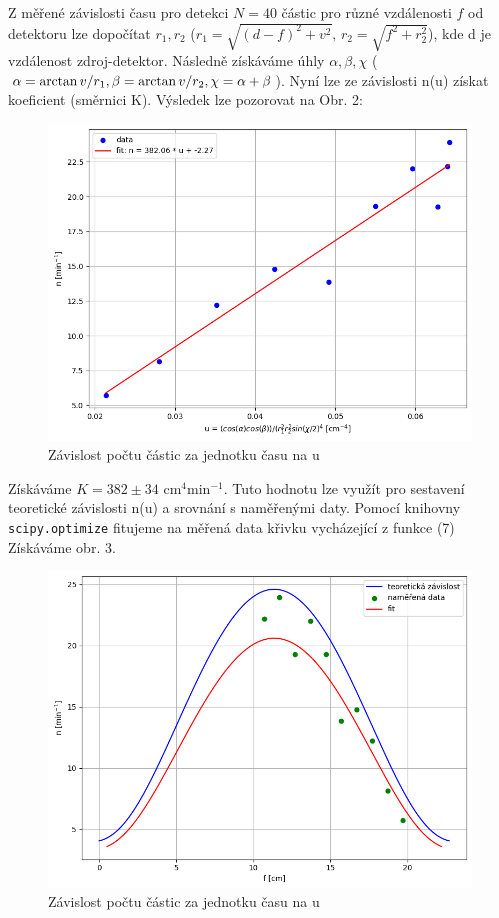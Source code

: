 \documentclass[czech,11pt,a4paper]{article}
\begin{document}
\begin{multicols}{2}
		Z měřené závislosti času pro detekci $N=40$ částic pro různé vzdálenosti $f$ od detektoru lze dopočítat $r_1, r_2$ ($r_1 = \sqrt{(d-f)^2 + v^2},\, r_2 = \sqrt{f^2 + r_2^2}$), kde d je vzdálenost zdroj-detektor. Následně získáváme úhly $\alpha, \beta, \chi$ ($\alpha = \arctan v/r_1, \, \\\beta = \arctan v/r_2, \chi = \alpha+\beta$). Nyní lze ze závislosti n(u) získat koeficient (směrnici K). Výsledek lze pozorovat na Obr. 2:
		\begin{figure}[H]
			\centering
			\includegraphics[width=0.9\linewidth]{fig2}
			\caption{Závislost počtu částic za jednotku času na u}
			
		\end{figure}
		Získáváme $K = 382 \pm 34 \,\,\mathrm{ cm^4 min^{-1}}$. Tuto hodnotu lze využít pro sestavení teoretické závislosti n(u) a srovnání s naměřenými daty. Pomocí knihovny \verb*|scipy.optimize| fitujeme na měřená data křivku vycházející z funkce (7) Získáváme obr. 3.
		\begin{figure}[H]
			\centering
			\includegraphics[width=0.9\linewidth]{fig3}
			\caption{Závislost počtu částic za jednotku času na u}
			

\end{figure}
\end{multicols}
\end{document}
